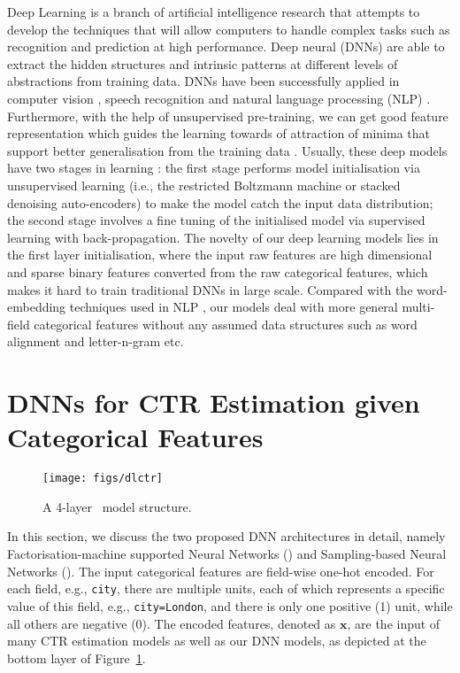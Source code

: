\documentclass{llncs}
\newcommand{\bs}{\boldsymbol}
\newcommand{\ft}{\texttt}
\newcommand{\fmnn}{\text{FNN}}
\newcommand{\snn}{\text{SNN}}
\begin{document}
Deep Learning \cite{bengio2009learning} is a branch of artificial intelligence research that attempts to develop the techniques that will allow computers to handle complex tasks such as recognition and prediction at high performance. Deep neural  (DNNs) are able to extract the hidden structures and intrinsic patterns at different levels of abstractions from training data. DNNs have been successfully applied in computer vision \cite{zeiler2011adaptive}, speech recognition \cite{deng2013deep} and natural language processing (NLP) \cite{collobert2011natural,huang2013learning,shen2014latent}. Furthermore, with the help of unsupervised pre-training, we can get good feature representation which guides the learning towards  of attraction of minima that support better generalisation from the training data \cite{erhan2010does}. Usually, these deep models have two stages in learning \cite{hinton2006reducing}: the first stage performs model initialisation via unsupervised learning (i.e., the restricted Boltzmann machine or stacked denoising auto-encoders) to make the model catch the input data distribution; the second stage involves a fine tuning of the initialised model via supervised learning with back-propagation. The novelty of our deep learning models lies in the first layer initialisation, where the input raw features are high dimensional and sparse binary features converted from the raw categorical features, which makes it hard to train traditional DNNs in large scale. Compared with the word-embedding techniques used in NLP \cite{huang2013learning,shen2014latent}, our models deal with more general multi-field categorical features without any assumed data structures such as word alignment and letter-n-gram etc.

\section{DNNs for CTR Estimation given Categorical Features}

\begin{figure}[t]
  \centering
  \vspace{-30pt}
  \texttt{[image: figs/dlctr]}\\
  \caption{A 4-layer \fmnn~model structure.}\label{fig:modelone}
\end{figure}

In this section, we discuss the two proposed DNN architectures in detail, namely Factorisation-machine supported Neural Networks (\fmnn) and Sampling-based Neural Networks (\snn).
The input categorical features are field-wise one-hot encoded. For each field, e.g., \ft{city}, there are multiple units, each of which represents a specific value of this field, e.g., \ft{city=London}, and there is only one positive (1) unit, while all others are negative (0). The encoded features, denoted as $\bs{x}$, are the input of many CTR estimation models \cite{richardson2007predicting,lee2012estimating} as well as our DNN models, as depicted at the bottom layer of Figure~\ref{fig:modelone}.
\end{document}
